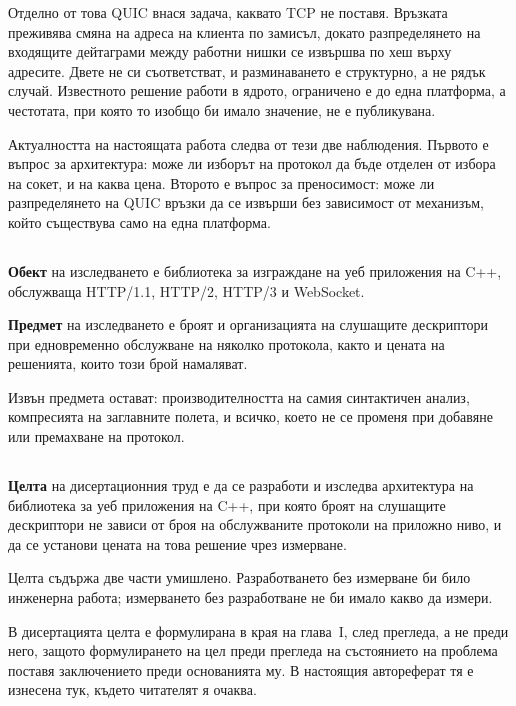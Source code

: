Отделно от това QUIC внася задача, каквато TCP не поставя. Връзката преживява смяна на
адреса на клиента по замисъл, докато разпределянето на входящите дейтаграми между работни
нишки се извършва по хеш върху адресите. Двете не си съответстват, и разминаването е
структурно, а не рядък случай. Известното решение работи в ядрото, ограничено е до една
платформа, а честотата, при която то изобщо би имало значение, не е публикувана.

Актуалността на настоящата работа следва от тези две наблюдения. Първото е въпрос за
архитектура: може ли изборът на протокол да бъде отделен от избора на сокет, и на каква цена.
Второто е въпрос за преносимост: може ли разпределянето на QUIC връзки да се извърши без
зависимост от механизъм, който съществува само на една платформа.

\subsection*{}

\textbf{Обект} на изследването е библиотека за изграждане на уеб приложения на C++,
обслужваща HTTP/1.1, HTTP/2, HTTP/3 и WebSocket.

\textbf{Предмет} на изследването е броят и организацията на слушащите дескриптори при
едновременно обслужване на няколко протокола, както и цената на решенията, които този брой
намаляват.

Извън предмета остават: производителността на самия синтактичен анализ, компресията на
заглавните полета, и всичко, което не се променя при добавяне или премахване на протокол.

\subsection*{}

\textbf{Целта} на дисертационния труд е да се разработи и изследва архитектура на библиотека
за уеб приложения на C++, при която броят на слушащите дескриптори не зависи от броя на
обслужваните протоколи на приложно ниво, и да се установи цената на това решение чрез
измерване.

Целта съдържа две части умишлено. Разработването без измерване би било инженерна работа;
измерването без разработване не би имало какво да измери.

В дисертацията целта е формулирана в края на глава~I, след прегледа, а не преди него, защото
формулирането на цел преди прегледа на състоянието на проблема поставя заключението преди
основанията му. В настоящия автореферат тя е изнесена тук, където читателят я очаква.

